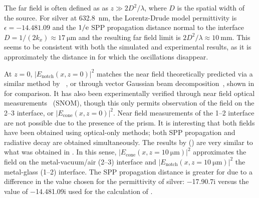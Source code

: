 The far field is often defined as as $z\gg 2 D^2/\lambda$, where $D$ is the
spatial width of the source.  For silver at \SI{632.8}{\nano\meter}, the
Lorentz-Drude
model permittivity is $\epsilon = \num{-14.48+1.09}$ and the $1/{\mathrm{e}}$ SPP
propagation distance normal to the interface $D = 1/(2 k_x) \approx
\SI{17}{\micro\meter}$ and the resulting far field limit is $2 D^2/\lambda
\approx \SI{10}{\milli\meter}$.  This seems to be consistent with both the
simulated and experimental results, as it is approximately the distance in
 for which the oscillations disappear.

At $z=0$, $|E_\text{notch}(x,z=0)|^2$ matches the near field theoretically
predicted via a similar method by ~\cite{chuang1986lateral}, or
through vector Gaussian beam decomposition~\cite{baida1999theoretical}, shown
in  for comparison.  It has also been experimentally
verified through near field optical measurements~\cite{dawson2001surface}
(SNOM), though this only permits observation of the field on the 2--3
interface, or $|E_\text{cone}(x,z=0)|^2$.  Near field measurements of the 1--2
interface are not possible due to the presence of the prism.  It is
interesting that both fields have been obtained using optical-only methods;
both SPP propagation and radiative decay are obtained simultaneously.  The
results by  () are very similar to what
was obtained in .  In this sense,
$|E_\text{cone}(x,z=\SI{10}{\micro\meter})|^2$ approximates the field on the
metal-vacuum/air (2--3) interface and
$|E_\text{notch}(x,z=\SI{10}{\micro\meter})|^2$ the metal-glass (1--2)
interface.  The SPP propagation distance is greater for  due to a
difference in the value chosen for the permittivity of silver:
\num{-17.9+0.7i} versus the value of \num{-14.48+1.09i} used for the
calculation of .

